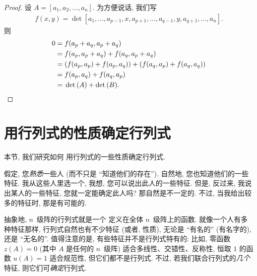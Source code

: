 \begin{proof}
    设 \(A = [a_1, a_2, \dots, a_n]\).
    为方便说话, 我们写
    \begin{align*}
        f(x, y)
        = \det {[a_1, \dots, a_{p-1}, x, a_{p+1}, \dots,
                    a_{q-1}, y, a_{q+1}, \dots, a_n]}.
    \end{align*}
    则
    \begin{align*}
        0
        = {} & f(a_p + a_q, a_p + a_q)               \\
        = {} & f(a_p, a_p + a_q) + f(a_q, a_p + a_q) \\
        = {} & (f(a_p, a_p) + f(a_p, a_q))
        + (f(a_q, a_p) + f(a_q, a_q))                \\
        = {} & f(a_p, a_q) + f(a_q, a_p)             \\
        = {} & \det {(A)} + \det {(B)}.
        \qedhere
    \end{align*}
\end{proof}

\section{用行列式的性质确定行列式}

本节, 我们研究如何%
用行列式的一些性质确定行列式.

假定, 您\emph{熟悉}一些人
(而不只是 ``知道他们的存在'').
自然地, 您也知道他们的一些特征.
我从这些人里选一个,
我想, 您可以说出此人的一些特征.
但是, 反过来,
我说出某人的一些特征,
您就一定能确定此人吗?
那自然是不一定的.
不过, 当我给出较多的特征时,
那是有可能的.

抽象地, \(n\)~级阵的行列式就是一个%
定义在全体 \(n\)~级阵上的函数.
就像一个人有多种特征那样,
行列式自然也有不少特征 (或者, 性质),
无论是 ``有名的'' (有名字的),
还是 ``无名的''.
值得注意的是,
有些特征并不是行列式特有的:
比如, 零函数 \(z(A) = 0\)
(其中 \(A\) 是任何的 \(n\)~级阵)
适合多线性、交错性、反称性,
恒取 \(1\) 的函数 \(u(A) = 1\)
适合规范性,
但它们都不是行列式.
不过, 若我们联合行列式的\emph{几个}特征,
则它们可\emph{确定}行列式.


